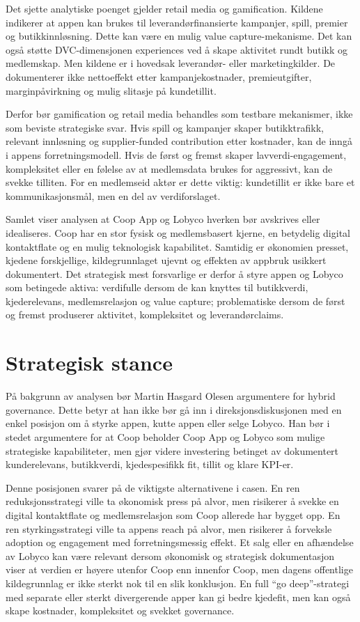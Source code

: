 \documentclass[12pt,a4paper]{article}
\begin{document}
Det sjette analytiske poenget gjelder retail media og gamification. Kildene indikerer at appen kan brukes til leverandørfinansierte kampanjer, spill, premier og butikkinnløsning. Dette kan være en mulig value capture-mekanisme. Det kan også støtte DVC-dimensjonen experiences ved å skape aktivitet rundt butikk og medlemskap. Men kildene er i hovedsak leverandør- eller marketingkilder. De dokumenterer ikke nettoeffekt etter kampanjekostnader, premieutgifter, marginpåvirkning og mulig slitasje på kundetillit.

Derfor bør gamification og retail media behandles som testbare mekanismer, ikke som beviste strategiske svar. Hvis spill og kampanjer skaper butikktrafikk, relevant innløsning og supplier-funded contribution etter kostnader, kan de inngå i appens forretningsmodell. Hvis de først og fremst skaper lavverdi-engagement, kompleksitet eller en følelse av at medlemsdata brukes for aggressivt, kan de svekke tilliten. For en medlemseid aktør er dette viktig: kundetillit er ikke bare et kommunikasjonsmål, men en del av verdiforslaget.

Samlet viser analysen at Coop App og Lobyco hverken bør avskrives eller idealiseres. Coop har en stor fysisk og medlemsbasert kjerne, en betydelig digital kontaktflate og en mulig teknologisk kapabilitet. Samtidig er økonomien presset, kjedene forskjellige, kildegrunnlaget ujevnt og effekten av appbruk usikkert dokumentert. Det strategisk mest forsvarlige er derfor å styre appen og Lobyco som betingede aktiva: verdifulle dersom de kan knyttes til butikkverdi, kjederelevans, medlemsrelasjon og value capture; problematiske dersom de først og fremst produserer aktivitet, kompleksitet og leverandørclaims.

\section{Strategisk stance}

På bakgrunn av analysen bør Martin Hasgard Olesen argumentere for hybrid governance. Dette betyr at han ikke bør gå inn i direksjonsdiskusjonen med en enkel posisjon om å styrke appen, kutte appen eller selge Lobyco. Han bør i stedet argumentere for at Coop beholder Coop App og Lobyco som mulige strategiske kapabiliteter, men gjør videre investering betinget av dokumentert kunderelevans, butikkverdi, kjedespesifikk fit, tillit og klare KPI-er.

Denne posisjonen svarer på de viktigste alternativene i casen. En ren reduksjonsstrategi ville ta økonomisk press på alvor, men risikerer å svekke en digital kontaktflate og medlemsrelasjon som Coop allerede har bygget opp. En ren styrkingsstrategi ville ta appens reach på alvor, men risikerer å forveksle adoption og engagement med forretningsmessig effekt. Et salg eller en afhændelse av Lobyco kan være relevant dersom økonomisk og strategisk dokumentasjon viser at verdien er høyere utenfor Coop enn innenfor Coop, men dagens offentlige kildegrunnlag er ikke sterkt nok til en slik konklusjon. En full ``go deep''-strategi med separate eller sterkt divergerende apper kan gi bedre kjedefit, men kan også skape kostnader, kompleksitet og svekket governance.
\end{document}
